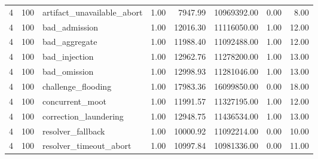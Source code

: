 \begin{table}
\begin{tabular}{rrlrrrrr}
4 & 100 & artifact\_unavailable\_abort & 1.00 & 7947.99 & 10969392.00 & 0.00 & 8.00 \\
4 & 100 & bad\_admission & 1.00 & 12016.30 & 11116050.00 & 1.00 & 12.00 \\
4 & 100 & bad\_aggregate & 1.00 & 11988.40 & 11092488.00 & 1.00 & 12.00 \\
4 & 100 & bad\_injection & 1.00 & 12962.76 & 11278200.00 & 1.00 & 13.00 \\
4 & 100 & bad\_omission & 1.00 & 12998.93 & 11281046.00 & 1.00 & 13.00 \\
4 & 100 & challenge\_flooding & 1.00 & 17983.36 & 16099850.00 & 0.00 & 18.00 \\
4 & 100 & concurrent\_moot & 1.00 & 11991.57 & 11327195.00 & 1.00 & 12.00 \\
4 & 100 & correction\_laundering & 1.00 & 12948.75 & 11436534.00 & 1.00 & 13.00 \\
4 & 100 & resolver\_fallback & 1.00 & 10000.92 & 11092214.00 & 0.00 & 10.00 \\
4 & 100 & resolver\_timeout\_abort & 1.00 & 10997.84 & 10981336.00 & 0.00 & 11.00 \\
\bottomrule
\end{tabular}
\end{table}
